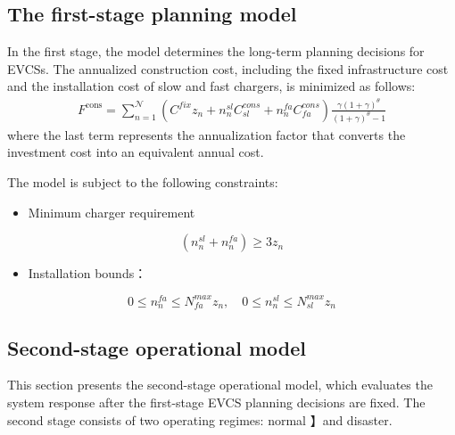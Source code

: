 \documentclass[journal]{IEEEtran}
\providecommand{\1}{\mathbf{1}}
\begin{document}
\subsection{The first-stage planning model}

\hspace*{0.7em} In the first stage, the model determines the long-term planning decisions for EVCSs. The annualized
construction cost, including the fixed infrastructure cost
and the installation cost of slow and fast chargers, is
minimized as follows:
\begin{equation}
\begin{aligned}
F^{\text{cons}}=
\sum_{n=1}^{\mathcal{N}}
(C^{{fix}}z_{n}
+n_{n}^{{sl}}
C_{{sl}}^{{cons}}
+n_{n}^{{fa}} C_{{fa}}^{{cons}})
\frac{\gamma(1+\gamma)^{\theta}}{(1+\gamma)^{\theta}-1}
\end{aligned}
\label{eq:cons}
\end{equation}
where the last term represents the annualization factor that converts the investment cost into an equivalent annual cost.

\hspace*{0.5em} The model is subject to the following constraints:
\begin{itemize}
    \item Minimum charger requirement
\end{itemize}
\begin{equation}
(n_{n}^{{sl}} + n_{n}^{{fa}}) \geq 3z_{n}
\label{eq:evse_number_limit1}
\end{equation}
\begin{itemize}
    \item Installation bounds：
\end{itemize}
\begin{equation}
0\le n_{n}^{{fa}}\le N^{max}_{fa}z_{n},\quad 
0\le n_{n}^{{sl}}\le N^{max}_{sl}z_{n}
\label{eq:evse_number_limit}
\end{equation}

\subsection{Second-stage operational model}

\hspace*{0.7em}This section presents the second-stage operational model, which evaluates the system response after the first-stage EVCS planning decisions are fixed. The second stage consists of two operating regimes: normal 】and disaster. 
\end{document}

